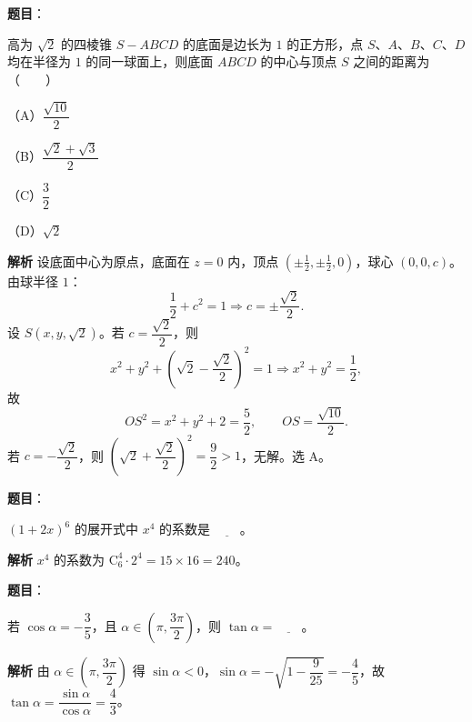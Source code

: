 \begin{answer}

\textbf{题目}：

高为 $\sqrt2$ 的四棱锥 $S-ABCD$ 的底面是边长为 $1$ 的正方形，点 $S$、$A$、$B$、$C$、$D$ 均在半径为 $1$ 的同一球面上，则底面 $ABCD$ 的中心与顶点 $S$ 之间的距离为\mbox{（　　）}

（A）$\dfrac{\sqrt{10}}2$

（B）$\dfrac{\sqrt2+\sqrt3}2$

（C）$\dfrac32$

（D）$\sqrt2$

\textbf{解析}
设底面中心为原点，底面在 $z=0$ 内，顶点 $(\pm\frac12,\pm\frac12,0)$，球心 $(0,0,c)$。由球半径 $1$：
\nopagebreak[4]
\[\frac12+c^2=1\Longrightarrow c=\pm\frac{\sqrt2}2.\]
设 $S(x,y,\sqrt2)$。若 $c=\dfrac{\sqrt2}2$，则
\nopagebreak[4]
\[x^2+y^2+\left(\sqrt2-\frac{\sqrt2}2\right)^2=1\Longrightarrow x^2+y^2=\frac12,\]
故
\nopagebreak[4]
\[OS^2=x^2+y^2+2=\frac52,\qquad OS=\frac{\sqrt{10}}2.\]
若 $c=-\dfrac{\sqrt2}2$，则 $\left(\sqrt2+\dfrac{\sqrt2}2\right)^2=\dfrac92>1$，无解。选 A。


\end{answer}
\begin{answer}

\textbf{题目}：

$(1+2x)^6$ 的展开式中 $x^4$ 的系数是 $\underline{\qquad}$。

\textbf{解析}
$x^4$ 的系数为 $\mathrm C_6^4\cdot2^4=15\times16=240$。


\end{answer}
\begin{answer}

\textbf{题目}：

若 $\cos\alpha=-\dfrac35$，且 $\alpha\in\left(\pi,\dfrac{3\pi}2\right)$，则 $\tan\alpha=\underline{\qquad}$。

\textbf{解析}
由 $\alpha\in\left(\pi,\dfrac{3\pi}2\right)$ 得 $\sin\alpha<0$，$\sin\alpha=-\sqrt{1-\dfrac9{25}}=-\dfrac45$，故 $\tan\alpha=\dfrac{\sin\alpha}{\cos\alpha}=\dfrac43$。


\end{answer}
